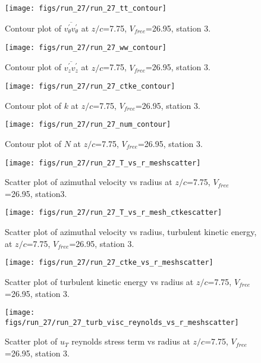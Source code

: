 \begin{figure}[H]
\centering
\texttt{[image: figs/run\_27/run\_27\_tt\_contour]}
\caption{Contour plot of $\overline{v_{\theta}^{\prime} v_{\theta}^{\prime}}$ at $z/c$=7.75, $V_{free}$=26.95, station 3.}
\end{figure}


\begin{figure}[H]
\centering
\texttt{[image: figs/run\_27/run\_27\_ww\_contour]}
\caption{Contour plot of $\overline{v_{z}^{\prime} v_{z}^{\prime}}$ at $z/c$=7.75, $V_{free}$=26.95, station 3.}
\end{figure}


\begin{figure}[H]
\centering
\texttt{[image: figs/run\_27/run\_27\_ctke\_contour]}
\caption{Contour plot of $k$ at $z/c$=7.75, $V_{free}$=26.95, station 3.}
\end{figure}


\begin{figure}[H]
\centering
\texttt{[image: figs/run\_27/run\_27\_num\_contour]}
\caption{Contour plot of $N$ at $z/c$=7.75, $V_{free}$=26.95, station 3.}
\end{figure}


\begin{figure}[H]
\centering
\texttt{[image: figs/run\_27/run\_27\_T\_vs\_r\_meshscatter]}
\caption{Scatter plot of azimuthal velocity vs radius at $z/c$=7.75, $V_{free}$=26.95, station3.}
\end{figure}


\begin{figure}[H]
\centering
\texttt{[image: figs/run\_27/run\_27\_T\_vs\_r\_mesh\_ctkescatter]}
\caption{Scatter plot of azimuthal velocity vs radius, turbulent kinetic energy, at $z/c$=7.75, $V_{free}$=26.95, station 3.}
\end{figure}


\begin{figure}[H]
\centering
\texttt{[image: figs/run\_27/run\_27\_ctke\_vs\_r\_meshscatter]}
\caption{Scatter plot of turbulent kinetic energy vs radius at $z/c$=7.75, $V_{free}$=26.95, station 3.}
\end{figure}


\begin{figure}[H]
\centering
\texttt{[image: figs/run\_27/run\_27\_turb\_visc\_reynolds\_vs\_r\_meshscatter]}
\caption{Scatter plot of $
u_T$ reynolds stress term vs radius at $z/c$=7.75, $V_{free}$=26.95, station 3.}
\end{figure}


